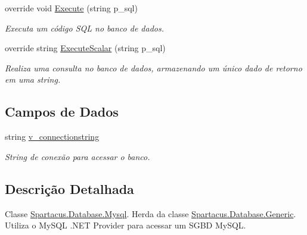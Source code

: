 \begin{DoxyCompactItemize}
override void \hyperlink{classSpartacus_1_1Database_1_1Mysql_afdef08fb8a30287e8c550798aa6b6742}{Execute} (string p\+\_\+sql)
\begin{DoxyCompactList}\small\item\em Executa um código S\+Q\+L no banco de dados. \end{DoxyCompactList}\item 
override string \hyperlink{classSpartacus_1_1Database_1_1Mysql_ac6d8b14aed570a1a740481a0720620ab}{Execute\+Scalar} (string p\+\_\+sql)
\begin{DoxyCompactList}\small\item\em Realiza uma consulta no banco de dados, armazenando um único dado de retorno em uma string. \end{DoxyCompactList}\end{DoxyCompactItemize}
\subsection*{Campos de Dados}
\begin{DoxyCompactItemize}
\item 
string \hyperlink{classSpartacus_1_1Database_1_1Mysql_ac29f25cd328e6bedd0b2f122040674ca}{v\+\_\+connectionstring}
\begin{DoxyCompactList}\small\item\em String de conexão para acessar o banco. \end{DoxyCompactList}\end{DoxyCompactItemize}


\subsection{Descrição Detalhada}
Classe \hyperlink{classSpartacus_1_1Database_1_1Mysql}{Spartacus.\+Database.\+Mysql}. Herda da classe \hyperlink{classSpartacus_1_1Database_1_1Generic}{Spartacus.\+Database.\+Generic}. Utiliza o My\+S\+Q\+L .N\+E\+T Provider para acessar um S\+G\+B\+D My\+S\+Q\+L. 



